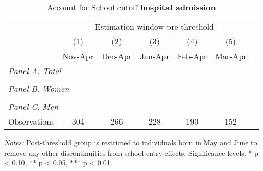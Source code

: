 \begin{table}[H] \centering 
	\begin{threeparttable} \centering \caption{Account for School cutoff \textbf{hospital admission}}\label{tab_mlch: DD_hospital2_total_school_cutoff}
		{\def\sym#1{\ifmmode^{#1}\else\(^{#1}\)\fi} 
			\begin{tabular}{l*{6}{c}}
				\toprule 
				& \multicolumn{5}{c}{Estimation window pre-threshold} \\ 
				\cmidrule(lr){2-6}
				&\multicolumn{1}{c}{(1)}&\multicolumn{1}{c}{(2)}&\multicolumn{1}{c}{(3)}&\multicolumn{1}{c}{(4)}&\multicolumn{1}{c}{(5)}\\
				&\multicolumn{1}{c}{Nov-Apr}&\multicolumn{1}{c}{Dec-Apr}&\multicolumn{1}{c}{Jan-Apr}&\multicolumn{1}{c}{Feb-Apr}&\multicolumn{1}{c}{Mar-Apr}\\
				\midrule
				\multicolumn{5}{l}{\emph{Panel A. Total}} \\
				 
				\\ 
				\multicolumn{5}{l}{\emph{Panel B. Women}} \\
				 
				\\
				\multicolumn{5}{l}{\emph{Panel C. Men}} \\
				 
				\midrule
				Observations & 304      &       266       &      228      &       190       &      152 \\
				
				\bottomrule 
		\end{tabular}}
		\begin{tablenotes} 
			\item \scriptsize \emph{Notes:} Post-threshold group is restricted to individuals born in May and June to remove any other discontinuities from school entry effects. \newline Significance levels: * p < 0.10, ** p < 0.05, *** p < 0.01.
		\end{tablenotes} 
	\end{threeparttable} 
\end{table}



